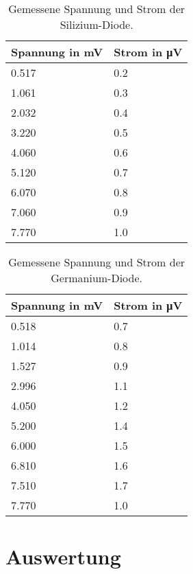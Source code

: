 \documentclass[
12pt,
a4paper,
bibliography=totocnumbered, %
BCOR=1cm, %
oneside, %
]{scrartcl}
\begin{document}
\begin{table}[H]
	\centering %
	\caption{Gemessene Spannung und Strom der Silizium-Diode.\label{tbl:SiSperr}}
	\begin{tabular}{ll}
		\toprule
		Spannung in \si{\milli\volt} & Strom in \si{\micro\volt} \\
		\midrule
		\num{0,517} & \num{0,2} \\
		\num{1,061} & \num{0,3} \\
		\num{2,032} & \num{0,4} \\
		\num{3,220} & \num{0,5} \\
		\num{4,060} & \num{0,6} \\
		\num{5,120} & \num{0,7} \\
		\num{6,070} & \num{0,8} \\
		\num{7,060} & \num{0,9} \\
		\num{7,770} & \num{1,0} \\
		\bottomrule
	\end{tabular}
\end{table}

\begin{table}[H]
	\centering %
	\caption{Gemessene Spannung und Strom der Germanium-Diode.\label{tbl:GeSperr}}
	\begin{tabular}{ll}
		\toprule
		Spannung in \si{\milli\volt} & Strom in \si{\micro\volt} \\
		\midrule
		\num{0,518} & \num{0,7} \\
		\num{1,014} & \num{0,8} \\
		\num{1,527} & \num{0,9} \\
		\num{2,996} & \num{1,1} \\
		\num{4,050} & \num{1,2} \\
		\num{5,200} & \num{1,4} \\
		\num{6,000} & \num{1,5} \\
		\num{6,810} & \num{1,6} \\
		\num{7,510} & \num{1,7} \\
		\num{7,770} & \num{1,0} \\
		\bottomrule
	\end{tabular}
\end{table}

\section{Auswertung}
\end{document}
